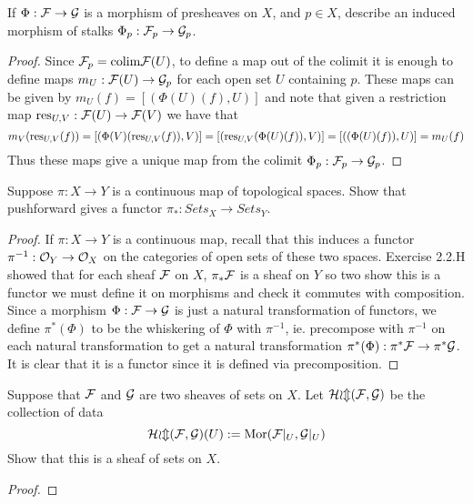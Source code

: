 
\begin{exercise}
    If $\Phi: \mathcal{F} \to \mathcal{G}$ is a morphism of presheaves on $X$, and $p \in X$, describe an induced morphism of stalks $\Phi_p: \mathcal{F}_p \to \mathcal{G}_p$.
\end{exercise}

\begin{proof}
    Since $\mathcal{F}_p = \text{colim} \mathcal{F}(U)$, to define a map out of the colimit it is enough to define maps $m_U: \mathcal{F}(U) \to \mathcal{G}_p$ for each open set $U$ containing $p$. These maps can be given by $m_U(f) = [(\Phi(U)(f), U)]$ and note that given a restriction map $\text{res}_{U, V}: \mathcal{F}(U) \to \mathcal{F}(V)$ we have that 
    \[ m_V( \text{res}_{U, V}(f)) = [( \Phi(V)(\text{res}_{U, V}(f)), V)]  = [( \text{res}_{U, V}(\Phi(U)(f)), V)] = [((\Phi(U)(f)), U)] = m_U(f) \]
    Thus these maps give a unique map from the colimit $\Phi_p: \mathcal{F}_p \to \mathcal{G}_p$. 
\end{proof}

\begin{exercise}
    Suppose $\pi: X \to Y$ is a continuous map of topological spaces. Show that pushforward gives a functor $\pi_*: Sets_X \to Sets_Y$.
\end{exercise}

\begin{proof}
    If $\pi: X \to Y$ is a continuous map, recall that this induces a functor $\pi^{-1}: \mathcal{O}_Y \to \mathcal{O}_X$ on the categories of open sets of these two spaces. Exercise 2.2.H showed that for each sheaf $\mathcal{F}$ on $X$, $\pi_*\mathcal{F}$ is a sheaf on $Y$ so two show this is a functor we must define it on morphisms and check it commutes with composition. Since a morphism $\Phi: \mathcal{F} \to \mathcal{G}$ is just a natural transformation of functors, we define $\pi^*(\Phi)$ to be the whiskering of $\Phi$ with $\pi^{-1}$, ie. precompose with $\pi^{-1}$ on each natural transformation to get a natural transformation $\pi^*(\Phi): \pi^*\mathcal{F} \to \pi^* \mathcal{G}$. It is clear that it is a functor since it is defined via precomposition. 
\end{proof}

\begin{exercise}
    Suppose that $\mathcal{F}$ and $\mathcal{G}$ are two sheaves of sets on $X$. Let $\mathcal{Hom}(\mathcal{F}, \mathcal{G})$ be the collection of data 
    \[ \mathcal{Hom}(\mathcal{F}, \mathcal{G})(U):= \text{Mor}(\mathcal{F}|_{U}, \mathcal{G}|_{U}) \] 
    Show that this is a sheaf of sets on $X$. 
\end{exercise}

\begin{proof}
    
\end{proof}

